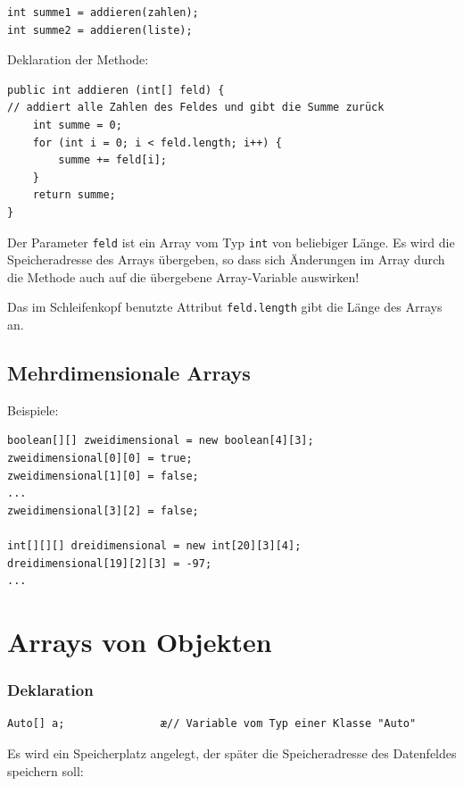 \begin{lstlisting}
int summe1 = addieren(zahlen);
int summe2 = addieren(liste);
\end{lstlisting}

Deklaration der Methode:

\begin{lstlisting}
public int addieren (int[] feld) {
// addiert alle Zahlen des Feldes und gibt die Summe zurück
    int summe = 0;
    for (int i = 0; i < feld.length; i++) {
        summe += feld[i];
    }
    return summe;
}
\end{lstlisting}

Der Parameter \lstinline|feld| ist ein Array vom Typ \lstinline|int| von
beliebiger Länge. Es wird die Speicheradresse des Arrays übergeben, so dass sich
Änderungen im Array durch die Methode auch auf die übergebene Array-Variable
auswirken!

Das im Schleifenkopf benutzte Attribut \lstinline|feld.length| gibt die Länge
des Arrays an.


\subsection{Mehrdimensionale Arrays \tagLK}

Beispiele:

\begin{lstlisting}
boolean[][] zweidimensional = new boolean[4][3];
zweidimensional[0][0] = true; 
zweidimensional[1][0] = false;
... 
zweidimensional[3][2] = false;

int[][][] dreidimensional = new int[20][3][4]; 
dreidimensional[19][2][3] = -97;
...
\end{lstlisting}


\section{Arrays von Objekten \tagLK}

\subsubsection{Deklaration}

\begin{lstlisting}
Auto[] a;               æ// Variable vom Typ einer Klasse "Auto"
\end{lstlisting}

Es wird ein Speicherplatz angelegt, der später die Speicheradresse des
Datenfeldes speichern soll:

